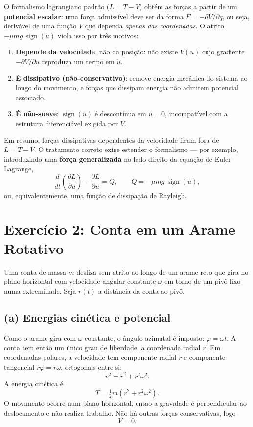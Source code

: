 \documentclass{article}
\begin{document}
O formalismo lagrangiano padrão ($L = T - V$) obtém as forças a partir de um \textbf{potencial escalar}: uma força admissível deve ser da forma $F = -\partial V/\partial q$, ou seja, derivável de uma função $V$ que dependa \textit{apenas das coordenadas}. O atrito $-\mu m g\, \operatorname{sign}(\dot{u})$ viola isso por três motivos:
\begin{enumerate}
    \item \textbf{Depende da velocidade}, não da posição: não existe $V(u)$ cujo gradiente $-\partial V/\partial u$ reproduza um termo em $\dot{u}$.
    \item \textbf{É dissipativo (não-conservativo)}: remove energia mecânica do sistema ao longo do movimento, e forças que dissipam energia não admitem potencial associado.
    \item \textbf{É não-suave}: $\operatorname{sign}(\dot{u})$ é descontínua em $\dot{u} = 0$, incompatível com a estrutura diferenciável exigida por $V$.
\end{enumerate}
Em resumo, forças dissipativas dependentes da velocidade ficam fora de $L = T - V$. O tratamento correto exige estender o formalismo — por exemplo, introduzindo uma \textbf{força generalizada} no lado direito da equação de Euler--Lagrange,
\[ \frac{d}{dt}\!\left( \frac{\partial L}{\partial \dot{u}} \right) - \frac{\partial L}{\partial u} = Q, \qquad Q = -\mu m g\, \operatorname{sign}(\dot{u}), \]
ou, equivalentemente, uma função de dissipação de Rayleigh.

\section*{Exercício 2: Conta em um Arame Rotativo}

Uma conta de massa $m$ desliza sem atrito ao longo de um arame reto que gira no
plano horizontal com velocidade angular constante $\omega$ em torno de um pivô fixo
numa extremidade. Seja $r(t)$ a distância da conta ao pivô.

\subsection*{(a) Energias cinética e potencial}

Como o arame gira com $\omega$ constante, o ângulo azimutal é imposto: $\varphi = \omega t$.
A conta tem então um único grau de liberdade, a coordenada radial $r$. Em coordenadas
polares, a velocidade tem componente radial $\dot r$ e componente tangencial $r\dot\varphi = r\omega$,
ortogonais entre si:
\[
v^2 = \dot r^2 + r^2\omega^2.
\]
A energia cinética é
\[
T = \tfrac{1}{2}m\left(\dot r^2 + r^2\omega^2\right).
\]
O movimento ocorre num plano horizontal, então a gravidade é perpendicular ao
deslocamento e não realiza trabalho. Não há outras forças conservativas, logo
\[
V = 0.
\]
\end{document}
